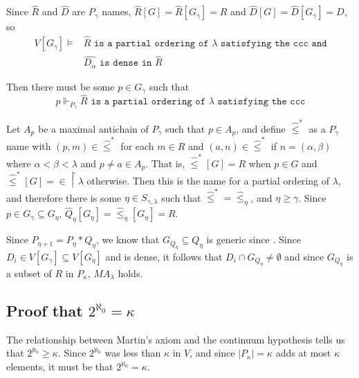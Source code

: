 \documentclass[12pt]{article}
\begin{document}
Since $\hat{R}$ and $\hat{D}$ are $P_\gamma$ names, $\hat{R}[G]=\hat{R}[G_\gamma]=R$ and $\hat{D}[G]=\hat{D}[G_\gamma]=D$, so 
$$
\begin{array}{rl}
V[G_\gamma]\vDash
&\hat{R}\texttt{ is a partial ordering of }\lambda\texttt{ satisfying the ccc and} \\
&\hat{D_\alpha}\texttt{ is dense in }\hat{R}
\end{array}
$$

Then there must be some $p\in G_\gamma$ such that $$p\Vdash_{P_\gamma}\hat{R}\texttt{ is a partial ordering of }\lambda\texttt{ satisfying the ccc}$$

Let $A_p$ be a maximal antichain of $P_\gamma$ such that $p\in A_p$, and define $\hat{\leq}^*$ as a $P_\gamma$ name with $(p,m)\in\hat{\leq}^*$ for each $m\in\hat{R}$ and $(a,n)\in\hat{\leq}^*$ if $n=(\alpha,\beta)$ where $\alpha<\beta<\lambda$ and $p\neq a\in A_p$.  That is, $\hat{\leq}^*[G]=R$ when $p\in G$ and $\hat{\leq}^*[G]=\in\upharpoonright\lambda$ otherwise.  Then this is the name for a partial ordering of $\lambda$, and therefore there is some $\eta\in S_{\gamma,\lambda}$ such that $\hat{\leq}^*=\hat{\leq}_\eta$, and $\eta\geq\gamma$.  Since $p\in G_\gamma\subseteq G_\eta$, $\hat{Q}_\eta[G_\eta]=\hat{\leq}_\eta[G_\eta]=R$.

Since $P_{\eta+1}=P_{\eta}*Q_\eta$, we know that $G_{Q_\eta}\subseteq Q_\eta$ is generic since .  Since $D_i\in V[G_\gamma]\subseteq V[G_\eta]$ and is dense, it follows that $D_i\cap G_{Q_\eta}\neq\emptyset$ and since $G_{Q_\eta}$ is a subset of $R$ in $P_\kappa$, $MA_\lambda$ holds.


\subsection*{Proof that $2^{\aleph_0}=\kappa$}
The relationship between Martin's axiom and the continuum hypothesis tells us that $2^{\aleph_0}\geq\kappa$.  Since $2^{\aleph_0}$ was less than $\kappa$ in $V$, and since $|P_\kappa|=\kappa$ adds at most $\kappa$ elements, it must be that $2^{\aleph_0}=\kappa$.
\end{document}
